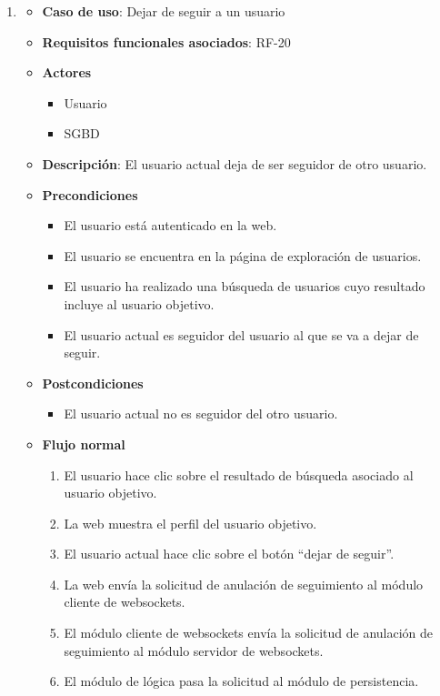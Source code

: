 \begin{enumerate}
\item %
  \begin{itemize}
  \item \textbf{Caso de uso}: Dejar de seguir a un usuario
  \item \textbf{Requisitos funcionales asociados}: RF-20
  \item \textbf{Actores}
    \begin{itemize}
    \item Usuario
    \item SGBD
    \end{itemize}
  \item \textbf{Descripción}: El usuario actual deja de ser seguidor de otro usuario.
  \item \textbf{Precondiciones}
    \begin{itemize}
    \item El usuario está autenticado en la web.
    \item El usuario se encuentra en la página de exploración de usuarios.
    \item El usuario ha realizado una búsqueda de usuarios cuyo resultado incluye al usuario objetivo.
    \item El usuario actual es seguidor del usuario al que se va a dejar de seguir.
    \end{itemize}
  \item \textbf{Postcondiciones}
    \begin{itemize}
    \item El usuario actual no es seguidor del otro usuario.
    \end{itemize}
  \item \textbf{Flujo normal}
    \begin{enumerate}
    \item El usuario hace clic sobre el resultado de búsqueda asociado al usuario objetivo.
    \item La web muestra el perfil del usuario objetivo.
    \item El usuario actual hace clic sobre el botón ``dejar de seguir''.
    \item La web envía la solicitud de anulación de seguimiento al módulo cliente de websockets.
    \item El módulo cliente de websockets envía la solicitud de anulación de seguimiento al módulo servidor de websockets.
    \item El módulo de lógica pasa la solicitud al módulo de persistencia.

\end{enumerate}
\end{itemize}
\end{enumerate}
